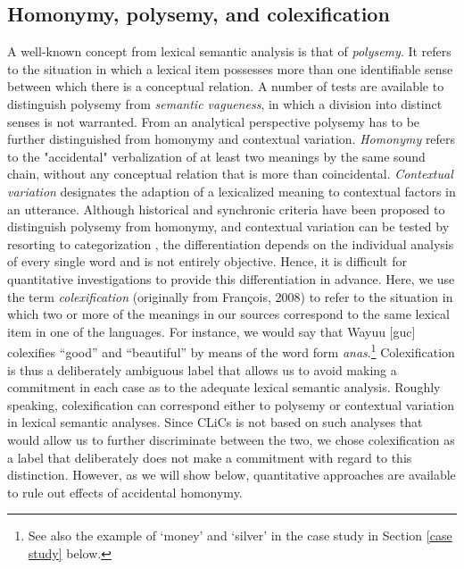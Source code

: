 \subsection{Homonymy, polysemy, and colexification}
A well-known concept from lexical semantic analysis is that of \emph{polysemy}. It refers to the situation
in which a lexical item possesses more than one identifiable sense between which there is a
conceptual relation. A number of tests are available to distinguish polysemy from \emph{semantic
vagueness}, in which a division into distinct senses is not warranted. From an analytical perspective
polysemy has to be further distinguished from {homonymy} and contextual variation.
\emph{Homonymy} refers to
the "accidental" verbalization of at least two meanings by the same sound chain, without any
conceptual relation that is more than coincidental. \emph{Contextual variation}
designates the adaption of a lexicalized meaning to contextual factors in an utterance. Although
historical and synchronic criteria have been proposed to distinguish polysemy from homonymy, and
contextual variation can be tested by resorting to categorization \cite{blank1997}, the
differentiation depends on the individual analysis of every single word and is not entirely
objective. Hence, it is difficult for quantitative investigations to provide this differentiation
in advance.
Here, we use the term \textit{colexification} (originally from Fran\c{c}ois, 2008)\nocite{francois2008}
to refer to the situation
in which two or more of the meanings in our sources correspond to the same lexical item in one of
the languages. For instance, we would say that Wayuu [guc] colexifies ``good'' and ``beautiful'' by means of the word form \textit{anas\textbari}.\footnote{See also the example of `money' and `silver' in the case study in Section \ref{case study} below.}
Colexification is thus a deliberately ambiguous label that allows us to avoid making a commitment in
each case as to the adequate lexical semantic analysis.
Roughly speaking,
colexification can correspond either to polysemy or contextual variation in lexical semantic analyses.
Since CLiCs is not based on such analyses that would allow us to further discriminate between the
two, we chose colexification as a label that deliberately does not make a commitment with regard to
this distinction. However, as we will show below, quantitative approaches are available to rule out effects of accidental homonymy. 

